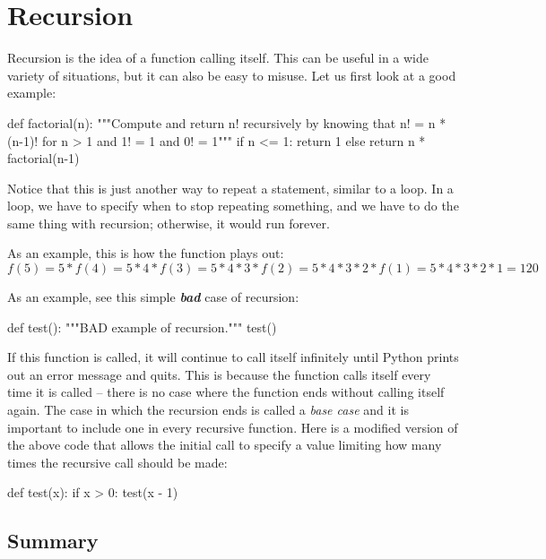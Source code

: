 \documentclass[11pt]{cselabheader}
\begin{document}
{\begin{itemize}
\end{itemize}


\pagebreak
\section{Recursion}
\label{sec:rec}

Recursion is the idea of a function calling itself. This can be useful in a wide
variety of situations, but it can also be easy to misuse. Let us first look at a
good example:
\begin{python3code}
def factorial(n):
    """Compute and return n! recursively by knowing that n! = n * (n-1)! for n > 1
    and 1! = 1 and 0! = 1"""
    if n <= 1:
        return 1
    else
        return n * factorial(n-1)
\end{python3code}

Notice that this is just another way to repeat a statement, similar to a loop.
In a loop, we have to specify when to stop repeating something, and we have to
do the same thing with recursion; otherwise, it would run forever.

As an example, this is how the function plays out:
\[ f(5) = 5 * f(4) = 5 * 4 * f(3) = 5 * 4 * 3 * f(2) = 5 * 4 * 3 * 2 * f(1) = 5
* 4 * 3 * 2 * 1 = 120 \]

As an example, see this simple \textbf{\emph{bad}} case of recursion:

\begin{python3code}
def test():
    """BAD example of recursion."""
    test()
\end{python3code}

If this function is called, it will continue to call itself infinitely until
Python prints out an error message and quits. This is because the function calls
itself every time it is called -- there is no case where the function ends
without calling itself again. The case in which the recursion ends is called a
\emph{base case} and it is important to include one in every recursive function.
Here is a modified version of the above code that allows the initial call to
specify a value limiting how many times the recursive call should be made:

\begin{python3code}
def test(x):
    if x > 0:
        test(x - 1)
\end{python3code}

\subsection{Summary}
\label{subsec:adv.sum}

}
\end{document}
